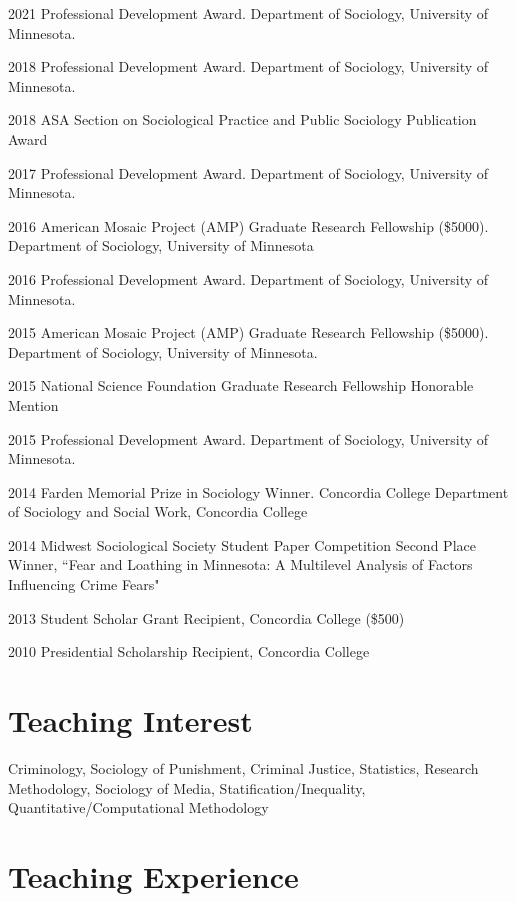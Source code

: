 \documentclass[letterpaper]{article}
\renewenvironment{itemize}{
  \begin{list}{}{
    \setlength{\leftmargin}{1.5em}
  }
}{
  \end{list}
}
\begin{document}
\begin{itemize}
\item 2021 Professional Development Award. Department of Sociology, University of Minnesota. 
\item 2018 Professional Development Award. Department of Sociology, University of Minnesota. 
\item 2018 ASA Section on Sociological Practice and Public Sociology Publication Award
\item 2017 Professional Development Award. Department of Sociology, University of Minnesota. 
\item 2016 American Mosaic Project (AMP) Graduate Research Fellowship (\$5000). Department of Sociology, University of Minnesota
\item 2016 Professional Development Award. Department of Sociology, University of Minnesota. 
\item 2015 American Mosaic Project (AMP) Graduate Research Fellowship (\$5000). Department of Sociology, University of Minnesota. 
\item 2015 National Science Foundation Graduate Research Fellowship Honorable Mention
\item 2015 Professional Development Award. Department of Sociology, University of Minnesota. 
\item 2014 Farden Memorial Prize in Sociology Winner. Concordia College Department of Sociology and Social Work, Concordia College
\item 2014 Midwest Sociological Society Student Paper Competition Second Place Winner,  ``Fear and Loathing in Minnesota: A Multilevel Analysis of Factors Influencing Crime Fears"
\item 2013 Student Scholar Grant Recipient, Concordia College (\$500)
\item 2010 Presidential Scholarship Recipient, Concordia College
\end{itemize}

\section*{\textbf{Teaching Interest}}

Criminology, Sociology of Punishment, Criminal Justice, Statistics, Research Methodology, Sociology of Media, Statification/Inequality, Quantitative/Computational Methodology

\section*{\textbf{Teaching Experience}}
\end{document}
